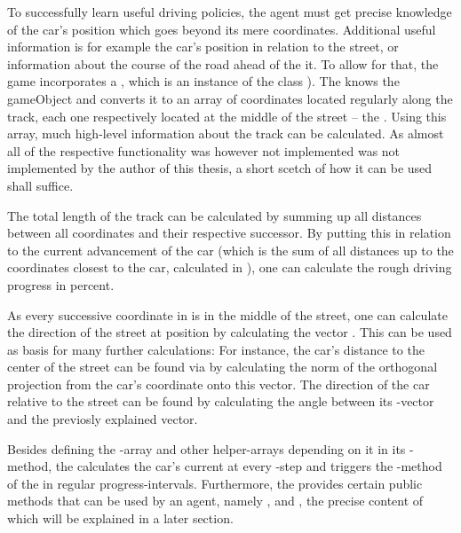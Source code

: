 To successfully learn useful driving policies, the agent must get precise knowledge of the car's position which goes beyond its mere coordinates. Additional useful information is for example the car's position in relation to the street, or information about the course of the road ahead of the it. To allow for that, the game incorporates a , which is an instance of the class ). The  knows the gameObject  and converts it to an array of coordinates located regularly along the track, each one respectively located at the middle of the street -- the . Using this array, much high-level information about the track can be calculated. As almost all of the respective functionality was however not implemented was not implemented by the author of this thesis, a short scetch of how it can be used shall suffice.

The total length of the track can be calculated by summing up all distances between all  coordinates and their respective successor. By putting this in relation to the current advancement of the car (which is the sum of all distances up to the coordinates closest to the car, calculated in ), one can calculate the rough driving progress in percent.

As every successive coordinate in  is in the middle of the street, one can calculate the direction of the street at position  by calculating the vector . This can be used as basis for many further calculations: For instance, the car's distance to the center of the street can be found via by calculating the norm of the orthogonal projection from the car's coordinate onto this vector. The direction of the car relative to the street can be found by calculating the angle between its -vector and the previosly explained vector.

Besides defining the -array and other helper-arrays depending on it in its -method, the  calculates the car's current  at every -step and triggers the -method of the  in regular progress-intervals. Furthermore, the  provides certain public methods that can be used by an agent, namely ,  and , the precise content of which will be explained in a later section.


